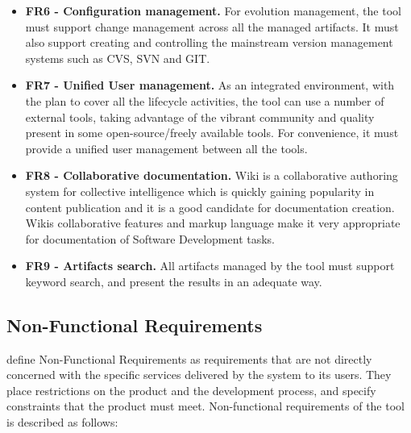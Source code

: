 \begin{itemize}
\item  \textbf{ FR6 - Configuration management.} For evolution management, the tool must support change management across all the managed artifacts. It must also support creating and controlling the mainstream version management systems such as CVS, SVN and GIT. 

\item  \textbf{ FR7 - Unified User management.}  As an integrated environment, with the plan to cover all the lifecycle activities, the tool can use a number of external tools, taking advantage of the vibrant community and quality present in some open-source/freely available tools. For convenience, it must provide a unified user management between all the tools.

\item  \textbf{ FR8 - Collaborative documentation.}  Wiki is a collaborative authoring system for collective intelligence which is quickly gaining popularity in content publication and it is a good candidate for documentation creation. Wikis collaborative features and markup language make it very appropriate for documentation of Software Development tasks. 

\item  \textbf{ FR9 - Artifacts search.} All artifacts managed by the tool must support keyword search, and present the results in an adequate way.
\end{itemize}

\subsection{ Non-Functional Requirements}

\cite{Sommerville2011} define Non-Functional Requirements as requirements that are not directly concerned with the specific services delivered by the system to its users. They place restrictions on the product and the development process, and specify constraints that the product must meet. Non-functional requirements of the tool is described as follows:

